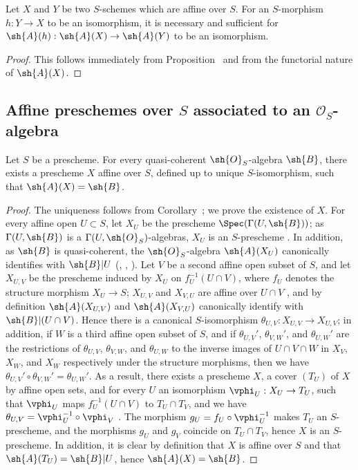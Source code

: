 \begin{corollary}[1.2.8]
\label{2.1.2.8}
Let $X$ and $Y$ be two $S$-schemes which are affine over $S$.
For an $S$-morphism $h:Y\to X$ to be an isomorphism, it is necessary and sufficient for $\sh{A}(h):\sh{A}(X)\to\sh{A}(Y)$ to be an isomorphism.
\end{corollary}

\begin{proof}
\label{proof-2.1.2.8}
This follows immediately from Proposition~ and from the functorial nature of $\sh{A}(X)$.
\end{proof}

\subsection{Affine preschemes over $S$ associated to an $\mathcal{O}_S$-algebra}
\label{subsection:2.1.3}

\begin{proposition}[1.3.1]
\label{2.1.3.1}
Let $S$ be a prescheme.
For every quasi-coherent $\sh{O}_S$-algebra $\sh{B}$, there exists a prescheme $X$ affine over $S$, defined up to unique $S$-isomorphism, such that $\sh{A}(X)=\sh{B}$.
\end{proposition}

\begin{proof}
\label{proof-2.1.3.1}
The uniqueness follows from Corollary~; we prove the existence of $X$.
For every affine open $U\subset S$, let $X_U$ be the prescheme $\Spec(\Gamma(U,\sh{B}))$; as $\Gamma(U,\sh{B})$ is a $\Gamma(U,\sh{O}_S)$-algebras, $X_U$ is an $S$-prescheme .
In addition, as $\sh{B}$ is quasi-coherent, the $\sh{O}_S$-algebra $\sh{A}(X_U)$ canonically identifies with $\sh{B}|U$ (, , ).
Let $V$ be a second affine open subset of $S$, and let $X_{U,V}$ be the prescheme induced by $X_U$ on $f_U^{-1}(U\cap V)$, where $f_U$ denotes the structure morphism $X_U\to S$; $X_{U,V}$ and $X_{V,U}$ are affine over $U\cap V$ , and by definition $\sh{A}(X_{U,V})$ and $\sh{A}(X_{V,U})$ canonically identify with $\sh{B}|(U\cap V)$.
Hence there is  a canonical $S$-isomorphism $\theta_{U,V}:X_{U,V}\to X_{U,V}$; in addition, if $W$ is a third affine open subset of $S$, and if $\theta_{U,V}'$, $\theta_{V,W}'$, and $\theta_{U,W}'$ are the restrictions of $\theta_{U,V}$, $\theta_{V,W}$, and $\theta_{U,W}$ to the inverse images of $U\cap V\cap W$ in $X_V$, $X_W$, and $X_W$ respectively under the structure morphisms, then we have $\theta_{U,V}'\circ\theta_{V,W}'=\theta_{U,W}'$.
As a result, there exists a prescheme $X$, a cover $(T_U)$ of $X$ by affine open sets, and for every $U$ an isomorphism $\vphi_U:X_U\to T_U$, such that $\vphi_U$ maps $f_U^{-1}(U\cap V)$ to $T_U\cap T_V$, and we have $\theta_{U,V}=\vphi_U^{-1}\circ\vphi_V$ .
The morphism $g_U=f_U\circ\vphi_U^{-1}$ makes $T_U$ an $S$-prescheme, and the morphisms $g_U$ and $g_V$ coincide on $T_U\cap T_V$, hence $X$ is an $S$-prescheme.
In addition, it is clear by definition that $X$ is affine over $S$ and that $\sh{A}(T_U)=\sh{B}|U$, hence $\sh{A}(X)=\sh{B}$.
\end{proof}

